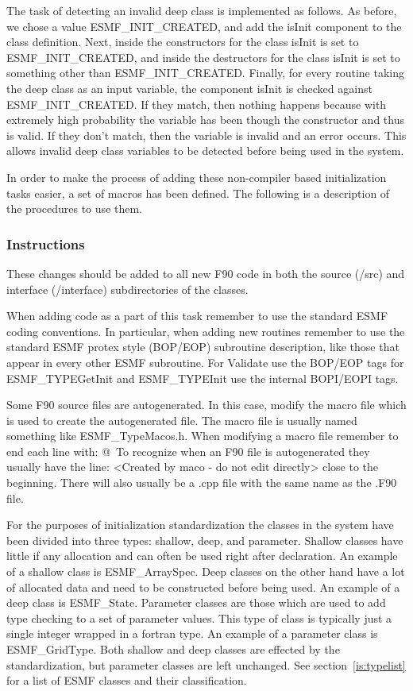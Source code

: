  The task of detecting an invalid deep class is
implemented as follows. As before, we chose a value
ESMF\_INIT\_CREATED, and add the isInit component to the class
definition. Next, inside the constructors for
the class isInit is set to ESMF\_INIT\_CREATED, and
inside the destructors for the class isInit
is set to something other than ESMF\_INIT\_CREATED.
Finally, for every routine taking the deep class
as an input variable, the component isInit is
checked against ESMF\_INIT\_CREATED. If they match, then
nothing happens because with extremely high
probability the variable has been though the
constructor and thus is valid. If they don't match,
then the variable is invalid and an error occurs.
This allows invalid deep class variables to be detected
before being used in the system.

 In order to make the process of adding these non-compiler
based initialization tasks easier, a set of macros has been defined.
The following is a description of the procedures to use them.

\subsubsection{Instructions}

 These changes should be added to all new F90 code in both the source
(/src) and interface (/interface) subdirectories of the classes.

 When adding code as a part of this task remember to use
the standard ESMF coding conventions. In particular, when adding 
new routines remember to use the standard 
ESMF protex style (BOP/EOP) subroutine description, like those that
appear in every other ESMF subroutine. For Validate use 
the BOP/EOP tags for ESMF\_TYPEGetInit and ESMF\_TYPEInit 
use the internal BOPI/EOPI tags. 

 Some F90 source files are autogenerated. In this case, modify
the macro file which is used to create the autogenerated file. 
The macro file is usually named something like ESMF\_TypeMacos.h.
When modifying a macro file remember to end each line
with: @\ To recognize when an F90 file is autogenerated
they usually have the line: <Created by maco - do not edit directly>
close to the beginning. There will also usually be a .cpp
file with the same name as the .F90 file.

 For the purposes of initialization standardization the 
classes in the system have been divided into three types: shallow, deep,
and parameter. Shallow classes have little if any allocation and
can often be used right after declaration. An example of a shallow
class is ESMF\_ArraySpec.  Deep classes on the other hand  have a lot of
allocated data and need to be constructed before being used. An example of
a deep class is ESMF\_State. Parameter classes are 
those which are used to add type checking to a set of parameter values.
This type of class is typically just a single integer wrapped in a fortran type.
An example of a parameter class is ESMF\_GridType. Both shallow and
deep classes are effected by the standardization, but parameter classes
are left unchanged. See section~\ref{is:typelist} for a list of
ESMF classes and their classification. 

